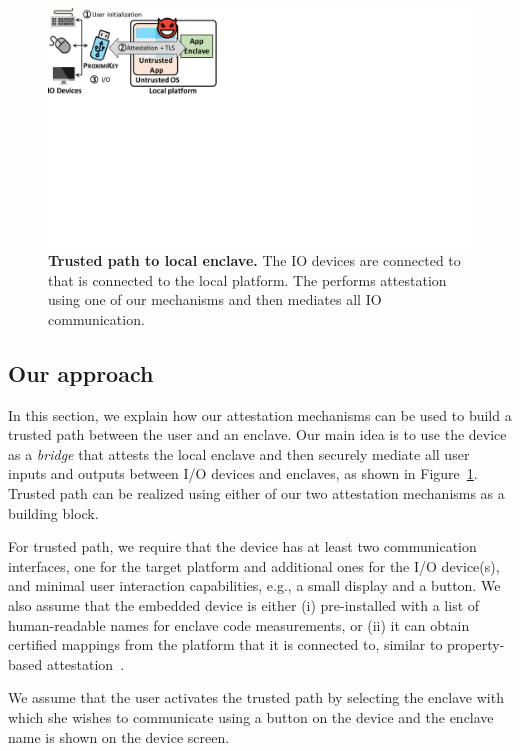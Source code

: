 \begin{figure}[t]
 \centering
 \includegraphics[trim={0 12cm 20cm 0},clip,width=0.65\linewidth]{chapters/ProximiTEE/images/TrustedPath_revised2.pdf}
 \caption{\textbf{Trusted path to local enclave.} The IO devices are connected to \device that is connected to the local platform. The \device performs attestation using one of our mechanisms and then mediates all IO communication.}

 \label{fig:secureInput}
\end{figure}

\subsection{Our approach}

In this section, we explain how our attestation mechanisms can be used to build a trusted path between the user and an enclave. Our main idea is to use the \device device as a \emph{bridge} that attests the local enclave and then securely mediate all user inputs and outputs between I/O devices and enclaves, as shown in Figure~\ref{fig:secureInput}. Trusted path can be realized using either of our two attestation mechanisms as a building block.

For trusted path, we require that the \device device has at least two communication interfaces, one for the target platform and additional ones for the I/O device(s), and minimal user interaction capabilities, e.g., a small display and a button. We also assume that the embedded device is either (i) pre-installed with a list of human-readable names for enclave code measurements, or (ii) it can obtain certified mappings from the platform that it is connected to, similar to property-based attestation~\cite{SadeghiProperty}.

We assume that the user activates the trusted path by selecting the enclave with which she wishes to communicate using a button on the device and the enclave name is shown on the device screen.%

